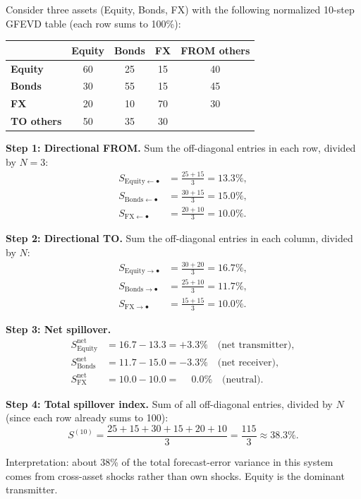\begin{workedexample}
Consider three assets (Equity, Bonds, FX) with the following normalized 10-step
GFEVD table (each row sums to 100\%):

\begin{center}
\begin{tabular}{lccc|c}
\toprule
& \textbf{Equity} & \textbf{Bonds} & \textbf{FX}
& \textbf{FROM others} \\
\midrule
\textbf{Equity} & 60 & 25 & 15 & 40 \\
\textbf{Bonds}  & 30 & 55 & 15 & 45 \\
\textbf{FX}     & 20 & 10 & 70 & 30 \\
\midrule
\textbf{TO others} & 50 & 35 & 30 & \\
\bottomrule
\end{tabular}
\end{center}

\textbf{Step 1: Directional FROM.}  Sum the off-diagonal entries in each row,
divided by $N = 3$:
\begin{align*}
  S_{\text{Equity} \leftarrow \bullet} &= \frac{25 + 15}{3} = 13.3\%, \\
  S_{\text{Bonds} \leftarrow \bullet}  &= \frac{30 + 15}{3} = 15.0\%, \\
  S_{\text{FX} \leftarrow \bullet}     &= \frac{20 + 10}{3} = 10.0\%.
\end{align*}

\textbf{Step 2: Directional TO.}  Sum the off-diagonal entries in each column,
divided by $N$:
\begin{align*}
  S_{\text{Equity} \rightarrow \bullet} &= \frac{30 + 20}{3} = 16.7\%, \\
  S_{\text{Bonds} \rightarrow \bullet}  &= \frac{25 + 10}{3} = 11.7\%, \\
  S_{\text{FX} \rightarrow \bullet}     &= \frac{15 + 15}{3} = 10.0\%.
\end{align*}

\textbf{Step 3: Net spillover.}
\begin{align*}
  S_{\text{Equity}}^{\text{net}} &= 16.7 - 13.3 = +3.3\% \quad \text{(net transmitter)}, \\
  S_{\text{Bonds}}^{\text{net}}  &= 11.7 - 15.0 = -3.3\% \quad \text{(net receiver)}, \\
  S_{\text{FX}}^{\text{net}}     &= 10.0 - 10.0 = \phantom{+}0.0\% \quad \text{(neutral)}.
\end{align*}

\textbf{Step 4: Total spillover index.}  Sum of all off-diagonal entries,
divided by $N$ (since each row already sums to 100):
\[
  S^{(10)} = \frac{25 + 15 + 30 + 15 + 20 + 10}{3}
           = \frac{115}{3} \approx 38.3\%.
\]

Interpretation: about 38\% of the total forecast-error variance in this system comes
from cross-asset shocks rather than own shocks.  Equity is the dominant transmitter.
\end{workedexample}

